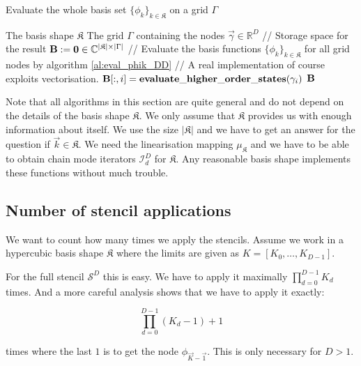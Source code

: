 \begin{algorithm}
\caption{Evaluate the whole basis set $\{\phi_k\}_{k \in \mathfrak{K}}$ on a grid $\Gamma$}
\label{al:eval_phi_basis}
\begin{algorithmic}
    \REQUIRE The basis shape $\mathfrak{K}$
    \REQUIRE The grid $\Gamma$ containing the nodes $\vec{\gamma} \in \mathbb{R}^D$
    \STATE // Storage space for the result
    \STATE $\mathbf{B} := \mathbf{0} \in \mathbb{C}^{|\mathfrak{K}| \times |\Gamma|}$
    \STATE // Evaluate the basis functions $\{\phi_k\}_{k \in \mathfrak{K}}$ for all grid nodes by algorithm \ref{al:eval_phik_DD}
    \STATE // A real implementation of course exploits vectorisation.
      \STATE $\mathbf{B}[:, i] = \mathbf{evaluate\_higher\_order\_states}(\gamma_i)$
    \ENDFOR
    \RETURN $\mathbf{B}$
\end{algorithmic}
\end{algorithm}


Note that all algorithms in this section are quite general and do not depend on
the details of the basis shape $\mathfrak{K}$. We only assume that $\mathfrak{K}$
provides us with enough information about itself. We use the size  $|\mathfrak{K}|$
and we have to get an answer for the question if $\vec{k} \in \mathfrak{K}$. We need
the linearisation mapping $\mu_{\mathfrak{K}}$ and we have to be able to obtain
chain mode iterators $\mathcal{I}^D_d$ for $\mathfrak{K}$. Any reasonable basis shape
implements these functions without much trouble.


\subsection{Number of stencil applications}


We want to count how many times we apply the stencils. Assume we work in a hypercubic
basis shape $\mathfrak{K}$ where the limits are given as $K = [K_0, \ldots, K_{D-1}]$.

For the full stencil $\mathcal{S}^D$ this is easy. We have to apply it maximally
$\prod_{d=0}^{D-1} K_d$ times. And a more careful analysis shows that we have to
apply it exactly:

\begin{equation}
  \prod_{d=0}^{D-1} (K_d -1) +1
\end{equation}

times where the last $1$ is to get the node $\phi_{\vec{K}-\vec{1}}$. This is only
necessary for $D > 1$.

